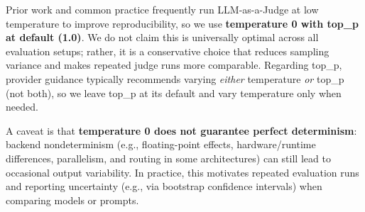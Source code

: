 Prior work and common practice frequently run LLM-as-a-Judge at low temperature to improve reproducibility, so we use \textbf{temperature 0 with top\_p at default (1.0)}. We do not claim this is universally optimal across all evaluation setups; rather, it is a conservative choice that reduces sampling variance and makes repeated judge runs more comparable. Regarding top\_p, provider guidance typically recommends varying \emph{either} temperature \emph{or} top\_p (not both), so we leave top\_p at its default and vary temperature only when needed.

A caveat is that \textbf{temperature 0 does not guarantee perfect determinism}: backend nondeterminism (e.g., floating-point effects, hardware/runtime differences, parallelism, and routing in some architectures) can still lead to occasional output variability. In practice, this motivates repeated evaluation runs and reporting uncertainty (e.g., via bootstrap confidence intervals) when comparing models or prompts.
